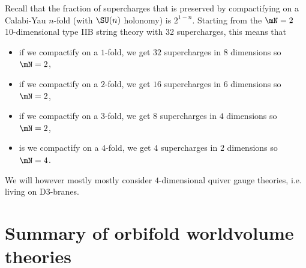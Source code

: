\documentclass{worksheetclass}
\begin{document}
    Recall that the fraction of supercharges that is preserved by compactifying on a Calabi-Yau $n$-fold (with $\SU(n)$ holonomy) is $2^{1-n}$. Starting from the $\mN=2$ 10-dimensional type IIB string theory with 32 supercharges, this means that
    \begin{itemize}
        \item if we compactify on a $1$-fold, we get $32$ supercharges in $8$ dimensions so $\mN=2$,
        \item if we compactify on a $2$-fold, we get $16$ supercharges in $6$ dimensions so $\mN=2$,
        \item if we compactify on a $3$-fold, we get $8$ supercharges in $4$ dimensions so $\mN=2$,
        \item is we compactify on a $4$-fold, we get $4$ supercharges in $2$ dimensions so $\mN=4$.
    \end{itemize}

    We will however mostly mostly consider $4$-dimensional quiver gauge theories, i.e. living on D$3$-branes.

\section{Summary of orbifold worldvolume theories}
\end{document}
